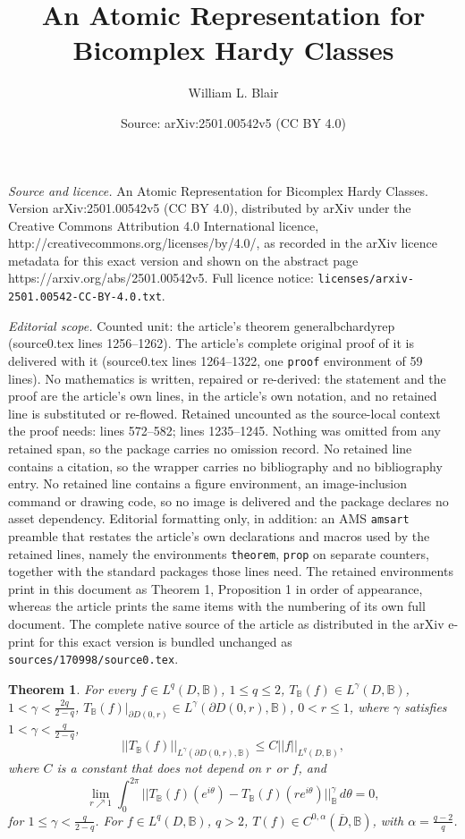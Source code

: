 \documentclass[10pt,a4paper]{amsart}
\title{An Atomic Representation for Bicomplex Hardy Classes}
\author{William L. Blair}
\date{Source: arXiv:2501.00542v5 (CC BY 4.0)}
\newtheorem{theorem}{Theorem}
\newcommand{\bc}{\mathbb{B}}
\newcommand{\p}{\partial}
\begin{document}
\maketitle

\noindent\emph{Source and licence.} An Atomic Representation for Bicomplex Hardy Classes. Version arXiv:2501.00542v5 (CC BY 4.0), distributed by arXiv under the Creative Commons Attribution 4.0 International licence, http://creativecommons.org/licenses/by/4.0/, as recorded in the arXiv licence metadata for this exact version and shown on the abstract page https://arxiv.org/abs/2501.00542v5. Full licence notice: \texttt{licenses/arxiv-2501.00542-CC-BY-4.0.txt}.\par\smallskip

\noindent\textit{Editorial scope.} Counted unit: the article's theorem generalbchardyrep (source0.tex lines 1256--1262). The article's complete original proof of it is delivered with it (source0.tex lines 1264--1322, one \texttt{proof} environment of 59 lines). No mathematics is written, repaired or re-derived: the statement and the proof are the article's own lines, in the article's own notation, and no retained line is substituted or re-flowed.  Retained uncounted as the source-local context the proof needs: lines 572--582; lines 1235--1245.  Nothing was omitted from any retained span, so the package carries no omission record.  No retained line contains a citation, so the wrapper carries no bibliography and no bibliography entry.  No retained line contains a figure environment, an image-inclusion command or drawing code, so no image is delivered and the package declares no asset dependency.  Editorial formatting only, in addition: an AMS \texttt{amsart} preamble that restates the article's own declarations and macros used by the retained lines, namely the environments \texttt{theorem}, \texttt{prop} on separate counters, together with the standard packages those lines need.  The retained environments print in this document as Theorem 1, Proposition 1 in order of appearance, whereas the article prints the same items with the numbering of its own full document.  The complete native source of the article as distributed in the arXiv e-print for this exact version is bundled unchanged as \texttt{sources/170998/source0.tex}.
\begin{theorem}\label{bctbehavior}
For every $f \in L^q(D, \bc)$, $1 \leq q \leq 2$, $T_\bc(f) \in L^\gamma(D,\bc)$, $1 < \gamma < \frac{2q}{2-q}$, $T_\bc(f)|_{\p D(0,r)} \in L^\gamma(\p D(0,r), \bc)$, $0 < r \leq 1$, where $\gamma$ satisfies $1 < \gamma < \frac{q}{2-q}$,  
\[
||T_\bc(f)||_{L^\gamma(\p D(0,r),\bc)} \leq C ||f||_{L^q(D,\bc)},
\]
where $C$ is a constant that does not depend on $r$ or $f$, and
\[
\lim_{r\nearrow 1} \int_0^{2\pi} ||T_\bc(f)(e^{i\theta}) - T_\bc(f)(re^{i\theta})||_\bc^\gamma \,d\theta = 0, 
\]
for $1 \leq \gamma < \frac{q}{2-q}$. For $f \in L^q(D,\bc)$, $q > 2$, $T(f) \in C^{0,\alpha}(\overline{D},\bc)$, with $\alpha = \frac{ q-2}{q}$. 
\end{theorem}
\end{document}
